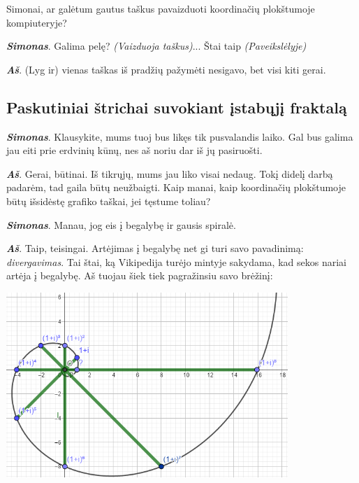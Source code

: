 \documentclass[a4paper]{article}
\newcommand{\say}[1]{\textbf{\textit{#1}}}
\begin{document}
Simonai, ar galėtum gautus taškus pavaizduoti koordinačių plokštumoje kompiuteryje?

\say{Simonas}. Galima pelę? \textit{(Vaizduoja taškus)}... Štai taip \textit{(Paveikslėlyje)} 

\say{Aš}. (Lyg ir) vienas taškas iš pradžių pažymėti nesigavo, bet visi kiti gerai.
\subsection*{Paskutiniai štrichai suvokiant įstabųjį fraktalą}
\begin{minipage}[b]{0.68\textwidth}
\say{Simonas}. Klausykite, mums tuoj bus likęs tik pusvalandis laiko. Gal bus galima jau eiti prie erdvinių kūnų, nes aš noriu dar iš jų pasiruošti.

\say{Aš}. Gerai, būtinai. Iš tikrųjų, mums jau liko visai nedaug. Tokį didelį darbą padarėm, tad gaila būtų neužbaigti. Kaip manai, kaip koordinačių plokštumoje būtų išsidėstę grafiko taškai, jei tęstume toliau?

\say{Simonas}. Manau, jog eis į begalybę ir gausis spiralė.

\say{Aš}. Taip, teisingai. Artėjimas į begalybę net gi turi savo pavadinimą: \textit{divergavimas}. Tai štai, ką Vikipedija turėjo mintyje sakydama, kad sekos nariai artėja į begalybę. Aš tuojau šiek tiek pagražinsiu savo brėžinį: 

\includegraphics[width=0.8\textwidth]{kriaukle.png}
\end{minipage}
\hspace{\fill}
\end{document}
